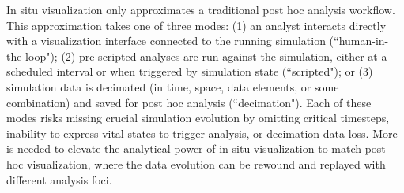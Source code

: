 \documentclass{vgtc}
\begin{document}
    
    


In situ visualization only approximates a traditional post hoc analysis workflow. This approximation takes one of three modes: (1) an analyst interacts directly with a visualization interface connected to the running simulation (``human-in-the-loop"); (2) pre-scripted analyses are run against the simulation, either at a scheduled interval or when triggered by simulation state (``scripted"); or (3) simulation data is decimated (in time, space, data elements, or some combination) and saved for post hoc analysis (``decimation"). Each of these modes risks missing crucial simulation evolution by omitting critical timesteps, inability to express vital states to trigger analysis, or decimation data loss. More is needed to elevate the analytical power of in situ visualization to match post hoc visualization, where the data evolution can be rewound and replayed with different analysis foci.
\end{document}
